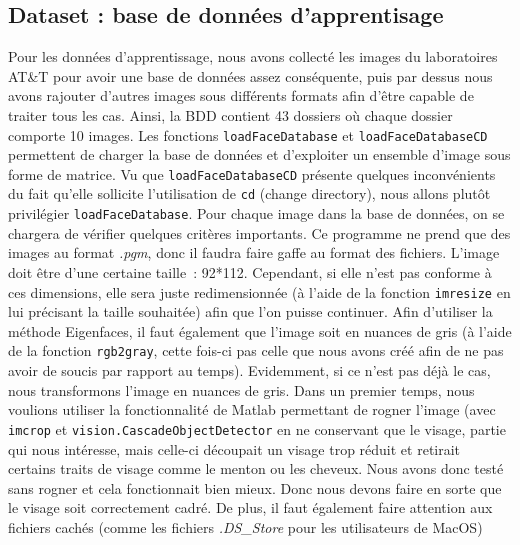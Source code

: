 \documentclass[12pt,a4paper]{article}
\begin{document}
\subsection{Dataset : base de données d'apprentisage}
Pour les données d'apprentissage, nous avons collecté les images du laboratoires AT\&T pour avoir une base de données assez conséquente, puis par dessus nous avons rajouter d'autres images sous différents formats afin d'être capable de traiter tous les cas.
Ainsi, la BDD contient 43 dossiers où chaque dossier comporte 10 images.
\newline
Les fonctions \texttt{loadFaceDatabase} et  \texttt{loadFaceDatabaseCD} permettent de charger la base de données et d'exploiter un ensemble d'image sous forme de matrice. Vu que \texttt{loadFaceDatabaseCD} présente quelques inconvénients du fait qu'elle sollicite l'utilisation de \texttt{cd} (change directory), nous allons plutôt privilégier \texttt{loadFaceDatabase}. 
\newline
Pour chaque image dans la base de données, on se chargera de vérifier quelques critères importants. Ce programme ne prend que des images au format \textit{.pgm}, donc il faudra faire gaffe au format des fichiers. L’image doit être d’une certaine taille : 92*112. Cependant, si elle n’est pas conforme à ces dimensions, elle sera juste redimensionnée (à l'aide de la fonction \texttt{imresize} en lui précisant la taille souhaitée) afin que l’on puisse continuer. Afin d’utiliser la méthode Eigenfaces, il faut également que l’image soit en nuances de gris (à l'aide de la fonction \texttt{rgb2gray}, cette fois-ci pas celle que nous avons créé afin de ne pas avoir de soucis par rapport au temps). Evidemment, si ce n’est pas déjà le cas, nous transformons l’image en nuances de gris. Dans un premier temps, nous voulions utiliser la fonctionnalité de Matlab permettant de rogner l’image (avec \texttt{imcrop} et \texttt{vision.CascadeObjectDetector} en ne conservant que le visage, partie qui nous intéresse, mais celle-ci découpait un visage trop réduit et retirait certains traits de visage comme le menton ou les cheveux. Nous avons donc testé sans rogner et cela fonctionnait bien mieux. Donc nous devons faire en sorte que le visage soit correctement cadré. De plus, il faut également faire attention aux fichiers cachés (comme les fichiers \textit{.DS\_Store} pour les utilisateurs de MacOS)
\end{document}
